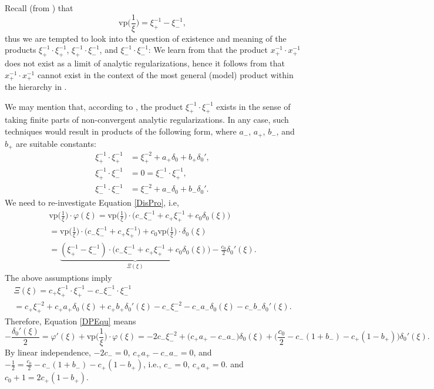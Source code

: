 \documentclass[sumlimits,intlimits,namelimits%
]{amsart}
\newcommand{\vp}{\mathrm{vp}}
\theoremstyle{definition}
\newcommand{\de}{\delta}
\newcommand{\vphi}{\varphi}
\begin{document}
Recall (from \cite[(3.2.10)${}'$ and (3.2.14)]{Hoermander:V1}) that 
$$
    \vp\Big(\frac{1}{\xi}\Big) = \xi_+^{-1} - \xi_-^{-1},
$$ 
thus we are tempted to look into the question of existence and meaning of the products $\xi_+^{-1} \cdot \xi_+^{-1}$, $\xi_+^{-1} \cdot \xi_-^{-1}$, and $\xi_-^{-1} \cdot \xi_-^{-1}$: 
We learn from \cite[Theorem 2]{Itano} that the product $x_+^{-1} \cdot x_+^{-1}$ does not exist as a limit of analytic regularizations, hence it follows from \cite[Remark 8.4]{O:92} that $x_+^{-1} \cdot x_+^{-1}$ cannot exist in the context of the most general (model) product within the hierarchy in \cite[page 69]{O:92}.

We may mention that, according to \cite[Theorem 3]{Itano}, the product $\xi_+^{-1} \cdot \xi_+^{-1}$ exists in the sense of taking finite parts of non-convergent analytic regularizations. In any case, such techniques would result in products of the following form, where $a_-$, $a_+$, $b_-$, and $b_+$ are suitable constants:
\begin{align*}
\xi_+^{-1} \cdot \xi_+^{-1} &= \xi_+^{-2} + a_+ \de_0 + b_+ \de_0',\\ 
\xi_+^{-1} \cdot \xi_-^{-1} &= 0 = \xi_-^{-1} \cdot \xi_+^{-1},\\ 
\xi_-^{-1} \cdot \xi_-^{-1} &= \xi_-^{-2} + a_- \de_0 + b_- \de_0'.
\end{align*}
We need to re-investigate Equation \eqref{DisPro}, i.e,
\begin{multline*}
    \vp\Big(\frac{1}{\xi}\Big) \cdot \vphi(\xi) =  
    \vp\Big(\frac{1}{\xi}\Big) \cdot \big( c_- \xi_-^{-1} + c_+ \xi_+^{-1} + c_0 \de_0(\xi) \big)\\
    =  \vp\Big(\frac{1}{\xi}\Big) \cdot \big( c_- \xi_-^{-1} + c_+ \xi_+^{-1}\big) +  
       c_0 \vp\Big(\frac{1}{\xi}\Big) \cdot \de_0(\xi)\\
    = \underbrace{(\xi_+^{-1} - \xi_-^{-1}) \cdot \big( c_- \xi_-^{-1} + c_+ \xi_+^{-1} + c_0 \de_0(\xi) \big)}_{\Xi(\xi)}
     - \frac{c_0}{2} \de_0'(\xi). 
\end{multline*}
The above assumptions imply
\begin{multline*}
    \Xi(\xi) = c_+ \xi_+^{-1} \cdot \xi_+^{-1} - c_- \xi_-^{-1} \cdot \xi_-^{-1}\\
    = c_+ \xi_+^{-2} + c_+ a_+ \de_0(\xi) + c_+ b_+ \de_0'(\xi) - c_- \xi_-^{-2} - c_- a_- \de_0(\xi) - c_- b_- \de_0'(\xi). 
\end{multline*}
Therefore, Equation \eqref{DPEqu} means
$$
   - \frac{ \de_0'(\xi) }{2}  = \vphi'(\xi) +  \vp\Big(\frac{1}{\xi}\Big) \cdot \vphi(\xi) =
       - 2 c_- \xi_-^{-2} + \big(c_+ a_+ - c_- a_-\big) \de_0(\xi) + \big(\frac{c_0}{2} - c_-(1 + b_-) - c_+(1 - b_+) \big) \de_0'(\xi).
$$
By linear independence, $- 2 c_- = 0$, $c_+ a_+ - c_- a_- = 0$,  and $- \frac{1}{2} = \frac{c_0}{2} - c_-(1+b_-) - c_+(1 - b_+)$, i.e., $c_- = 0$, $c_+ a_+ = 0$. and $c_0 + 1 = 2 c_+ (1 - b_+)$. 
\end{document}
